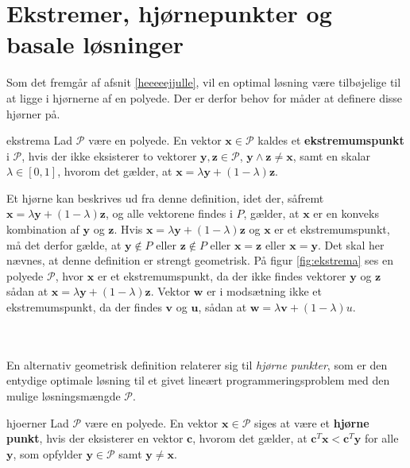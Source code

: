 \section{Ekstremer, hjørnepunkter og basale løsninger}
%
Som det fremgår af afsnit \ref{heeeeejjulle}, vil en optimal løsning være tilbøjelige til at ligge i hjørnerne af en polyede.
Der er derfor behov for måder at definere disse hjørner på.
%
\begin{defn}{}{ekstrema}
Lad $\mathcal{P}$ være en polyede. 
En vektor $\mathbf{x} \in \mathcal{P}$ kaldes et \textbf{ekstremumspunkt} i $\mathcal{P}$, hvis der ikke eksisterer to vektorer $\mathbf{y},\mathbf{z} \in \mathcal{P}$, $\mathbf{y} \land \mathbf{z} \neq \mathbf{x}$, 
samt en skalar $\lambda \in [0,1]$, hvorom det gælder, at $\mathbf{x}=\lambda\mathbf{y}+(1-\lambda)\textbf{z}$.
\end{defn}
\noindent
%
%
Et hjørne kan beskrives ud fra denne definition, idet der, såfremt $\mathbf{x}=\lambda\mathbf{y}+(1-\lambda) \mathbf{z}$, og alle vektorene findes i $P$, gælder, at $\mathbf{x}$ er en konveks kombination af $\mathbf{y}$ og $\mathbf{z}$.
Hvis $\mathbf{x}=\lambda\mathbf{y}+(1-\lambda) \textbf{z}$ og $\mathbf{x}$ er et ekstremumspunkt, må det derfor gælde, at $\mathbf{y}\notin P$ eller $\mathbf{z}\notin P$ eller $\mathbf{x}=\mathbf{z}$ eller $\mathbf{x}=\mathbf{y}$. 
Det skal her nævnes, at denne definition er strengt geometrisk. 
På figur \ref{fig:ekstrema} ses en polyede $\mathcal{P}$, hvor $\textbf{x}$ er et ekstremumspunkt, da der ikke findes vektorer $\textbf{y}$ og $\textbf{z}$ sådan at $\mathbf{x}=\lambda\mathbf{y}+(1-\lambda) \mathbf{z}$. Vektor $\textbf{w}$ er i modsætning ikke et ekstremumspunkt, da der findes $\textbf{v}$ og $\textbf{u}$, sådan at $\mathbf{w}=\lambda\mathbf{v}+(1-\lambda)u$.
%

\\\\
%
En alternativ geometrisk definition relaterer sig til \textit{hjørne punkter}, som er den entydige optimale løsning til et givet lineært programmeringsproblem med den mulige løsningsmængde $\mathcal{P}$.
%
\begin{defn}{}{hjoerner}
Lad $\mathcal{P}$ være en polyede. 
En vektor $\mathbf{x}\in \mathcal{P}$ siges at være et \textbf{hjørne punkt}, hvis der eksisterer en vektor $\mathbf{c}$, hvorom det gælder, at $\mathbf{c}^T\mathbf{x}<\mathbf{c}^T\mathbf{y}$ for alle $\mathbf{y}$, som opfylder $\mathbf{y} \in \mathcal{P}$ samt $\mathbf{y}\neq\mathbf{x}$.
\end{defn}
